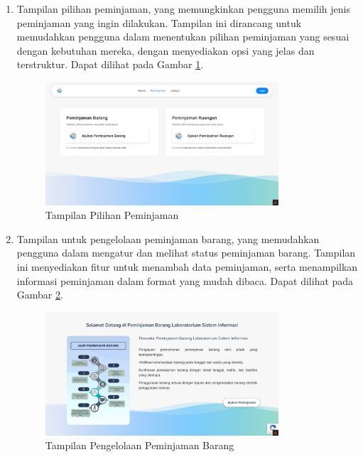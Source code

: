 \begin{enumerate}
	\item Tampilan pilihan peminjaman, yang memungkinkan pengguna memilih jenis peminjaman yang ingin dilakukan. Tampilan ini dirancang untuk memudahkan pengguna dalam menentukan pilihan peminjaman yang sesuai dengan kebutuhan mereka, dengan menyediakan opsi yang jelas dan terstruktur. Dapat dilihat pada Gambar \ref{fig:pilih-peminjaman}.
	      \begin{figure}
		      \centering
		      \includegraphics[width=0.82\textwidth]{konten/gambar/perbaikan/pilih-peminjaman.jpeg}
		      \caption{Tampilan Pilihan Peminjaman}
		      \label{fig:pilih-peminjaman}
	      \end{figure}
	\item Tampilan untuk pengelolaan peminjaman barang, yang memudahkan pengguna dalam mengatur dan melihat status peminjaman barang. Tampilan ini menyediakan fitur untuk menambah data peminjaman, serta menampilkan informasi peminjaman dalam format yang mudah dibaca. Dapat dilihat pada Gambar \ref{fig:peminjaman-barang}.
	      \begin{figure}
		      \centering
		      \includegraphics[width=0.82\textwidth]{konten/gambar/perbaikan/peminjaman-barang.jpeg}
		      \caption{Tampilan Pengelolaan Peminjaman Barang}
		      \label{fig:peminjaman-barang}
	      \end{figure}


\end{enumerate}
